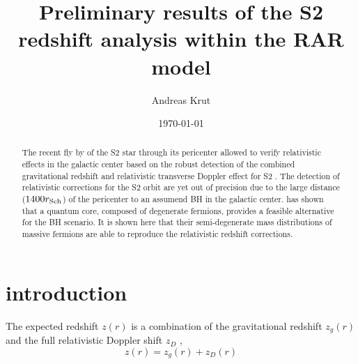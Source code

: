\documentclass[nofootinbib,tightenlines,nobibnotes,aps,prl,preprint,groupedaddress]{revtex4-1}
\begin{document}
\title{Preliminary results of the S2 redshift analysis within the RAR model}

\author{Andreas Krut}

\date{\today}


\begin{abstract}
The recent fly by of the S2 star through its pericenter allowed to verify relativistic effects in the galactic center based on the robust detection of the combined gravitational redshift and relativistic transverse Doppler effect for S2 \citep{2018A&A...615L..15G}. The detection of relativistic corrections for the S2 orbit are yet out of precision due to the large distance ($1400r_{\rm Sch}$) of the pericenter to an assumend BH in the galactic center. \citet{arguelles_novel_2018} has shown that a quantum core, composed of degenerate fermions, provides a feasible alternative for the BH scenario. It is shown here that their semi-degenerate mass distributions of massive fermions are able to reproduce the relativistic redshift corrections.
\end{abstract}

\pacs{}


\maketitle



\section{introduction}
The expected redshift $z(r)$ is a combination of the gravitational redshift $z_g(r)$ and the full relativistic Doppler shift $z_D$ \citep{2006ApJ...639L..21Z}, \begin{equation}
	\label{eqn:redshift}
	z(r) = z_g(r) + z_D(r)
\end{equation}
\end{document}
